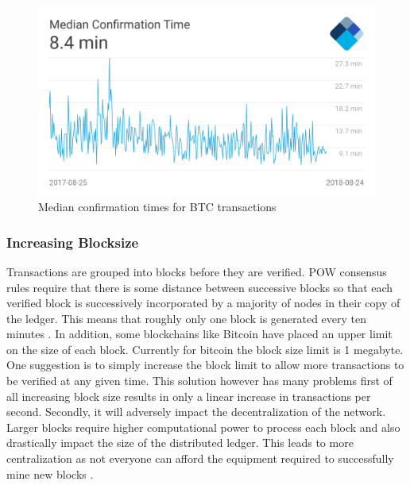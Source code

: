 \begin{figure}[h]
	\centering
    \includegraphics[width=120mm,scale=1]{figs/median-confirmation-time}
	\caption{Median confirmation times for BTC transactions \cite{fig:001}}
	\label{fig:mct}
\end{figure}
\clearpage

\subsubsection{Increasing Blocksize}
Transactions are grouped into blocks before they are verified. POW consensus rules require that there is some distance between successive blocks so that each verified block is successively incorporated by a majority of nodes in their copy of the ledger. This means that roughly only one block is generated every ten minutes \cite{paper:001}. In addition, some blockchains like Bitcoin have placed an upper limit on the size of each block. Currently for bitcoin the block size limit is 1 megabyte. One suggestion is to simply increase the block limit to allow more transactions to be verified at any given time.  This solution however has many problems first of all increasing block size results in only a linear increase in transactions per second. Secondly, it will adversely impact the decentralization of the network. Larger blocks require higher computational power to process each block and also drastically impact the size of the distributed ledger. This leads to more centralization as not everyone can afford the equipment required to successfully mine new blocks \cite{medium:006}. 
